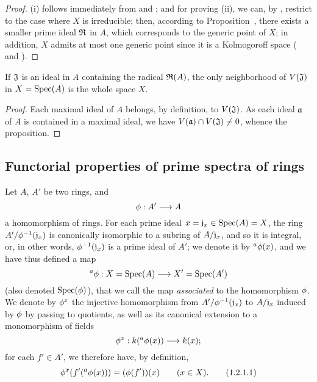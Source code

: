 \begin{proof}
\label{proof-1.1.1.14}
(i) follows immediately from  and ;
and for proving (ii), we can, by , restrict to the case where $X$ is irreducible;
then, according to Proposition~, there exists a smaller prime ideal $\mathfrak{R}$ in $A$, which corresponds to the generic point
of $X$;
in addition, $X$ admits at most one generic point since it is a Kolmogoroff space ( and ).
\end{proof}

\begin{prop}[1.1.15]
\label{1.1.1.15}
If $\mathfrak{J}$ is an ideal in $A$ containing the radical $\mathfrak{R}(A)$, the only
neighborhood of $V(\mathfrak{J})$ in $X={\mathop{\mathrm{Spec}}\nolimits}(A)$ is the whole space $X$.
\end{prop}

\begin{proof}
\label{proof-1.1.1.15}
Each maximal ideal of $A$ belongs, by definition, to $V(\mathfrak{J})$.
As each ideal $\mathfrak{a}$ of $A$ is contained in a maximal ideal, we have $V(\mathfrak{a})\cap V(\mathfrak{J})\neq 0$, whence the proposition.
\end{proof}

\subsection{Functorial properties of prime spectra of rings}
\label{subsection-func-prop}

\begin{env}[1.2.1]
\label{1.1.2.1}
Let $A$, $A'$ be two rings, and
\[
  \vphi:A'\to A
\]
a homomorphism of rings.
For each prime ideal $x=\mathfrak{j}_x\in{\mathop{\mathrm{Spec}}\nolimits}(A)=X$, the ring $A'/\phi^{-1}(\mathfrak{j}_x)$ is canonically isomorphic to a subring of $A/\mathfrak{j}_x$, and so it is integral, or, in other words, $\phi^{-1}(\mathfrak{j}_x)$ is a prime ideal of $A'$;
we denote it by ${}^a\phi(x)$, and we have thus defined a map
\[
  {}^a\vphi:X=\Spec(A)\to X'=\Spec(A')
\]
(also denoted ${\mathop{\mathrm{Spec}}\nolimits}(\phi)$), that we call the map \emph{associated} to the homomorphism $\phi$.
We denote by $\phi^x$ the injective homomorphism from $A'/\phi^{-1}(\mathfrak{j}_x)$ to $A/\mathfrak{j}_x$ induced by $\phi$ by passing to quotients, as well as its canonical extension to a monomorphism of fields
\[
  \vphi^x:\kres({}^a\vphi(x))\to\kres(x);
\]
for each $f'\in A'$, we therefore have, by definition,
\[
  \phi^x(f'({}^a\phi(x)))=(\phi(f'))(x)\qquad(x\in X).
  \tag{1.2.1.1}
\]
\end{env}

